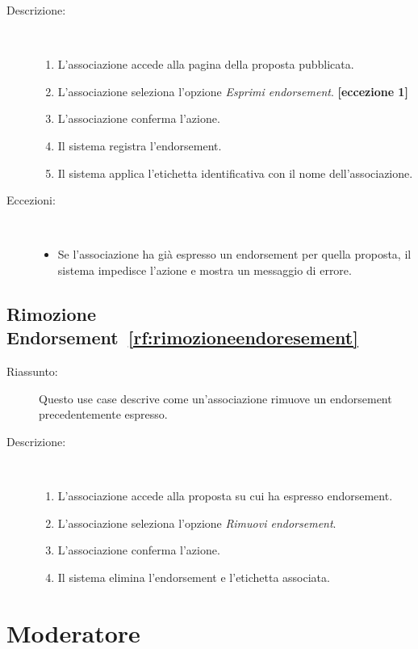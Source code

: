 \begin{ucscope}
\begin{description}
	\item[Descrizione:]~
	\begin{enumerate}
		\item L’associazione accede alla pagina della proposta pubblicata.
		\item L’associazione seleziona l’opzione \emph{Esprimi endorsement}. \textbf{[eccezione 1]}
		\item L’associazione conferma l’azione.
		\item Il sistema registra l’endorsement.
		\item Il sistema applica l’etichetta identificativa con il nome dell’associazione.
	\end{enumerate}

	\item[Eccezioni:]~
	\begin{itemize}
		\item[(1)] Se l’associazione ha già espresso un endorsement per quella proposta, il sistema impedisce l’azione e mostra un messaggio di errore.
	\end{itemize}
\end{description}

\subsection{Rimozione Endorsement~\ref{rf:rimozioneendoresement}}

\begin{description}
	\item[Riassunto:]
	Questo use case descrive come un’associazione rimuove un endorsement precedentemente espresso.

	\item[Descrizione:]~
	\begin{enumerate}
		\item L’associazione accede alla proposta su cui ha espresso endorsement.
		\item L’associazione seleziona l’opzione \emph{Rimuovi endorsement}.
		\item L’associazione conferma l’azione.
		\item Il sistema elimina l’endorsement e l'etichetta associata.
	\end{enumerate}
\end{description}

\section{Moderatore}



\end{ucscope}
